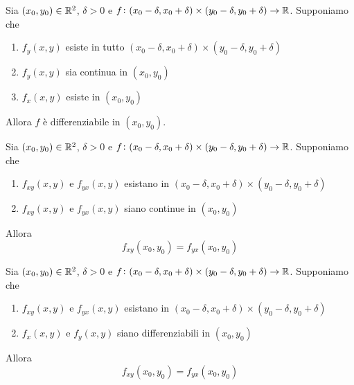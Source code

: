 \begin{thm}
	Sia $ (x_0, y_0) \in \mathbb{R}^2 $, $ \delta > 0 $ e $ f \colon (x_0 - \delta, x_0 + \delta) \times (y_0 - \delta, y_0 + \delta) \to \mathbb{R} $. Supponiamo che 
	\begin{enumerate}[label = (\roman*)]
		\item $ f_y(x, y) $ esiste in tutto $ (x_0 - \delta, x_0 + \delta) \times (y_0 - \delta, y_0 + \delta) $
		\item $ f_y(x, y) $ sia continua in $ (x_0, y_0) $
		\item $ f_x(x, y) $ esiste in $ (x_0, y_0) $
	\end{enumerate}
	Allora $ f $ è differenziabile in $ (x_0, y_0) $. 
\end{thm}

\begin{thm}[Schwarz 1]
	Sia $ (x_0, y_0) \in \mathbb{R}^2 $, $ \delta > 0 $ e $ f \colon (x_0 - \delta, x_0 + \delta) \times (y_0 - \delta, y_0 + \delta) \to \mathbb{R} $. Supponiamo che 
	\begin{enumerate}[label = (\roman*)]
		\item $ f_{xy}(x, y) $ e $ f_{yx}(x, y) $ esistano in $ (x_0 - \delta, x_0 + \delta) \times (y_0 - \delta, y_0 + \delta) $
		\item $ f_{xy}(x, y) $ e $ f_{yx}(x, y) $ siano continue in $ (x_0, y_0) $
	\end{enumerate}
	Allora 
	\begin{equation}
		f_{xy}(x_0, y_0) = f_{yx}(x_0, y_0)
	\end{equation}
\end{thm}

\begin{thm}[Schwarz 2]
	Sia $ (x_0, y_0) \in \mathbb{R}^2 $, $ \delta > 0 $ e $ f \colon (x_0 - \delta, x_0 + \delta) \times (y_0 - \delta, y_0 + \delta) \to \mathbb{R} $. Supponiamo che 
	\begin{enumerate}[label = (\roman*)]
		\item $ f_{xy}(x, y) $ e $ f_{yx}(x, y) $ esistano in $ (x_0 - \delta, x_0 + \delta) \times (y_0 - \delta, y_0 + \delta) $
		\item $ f_{x}(x, y) $ e $ f_{y}(x, y) $ siano differenziabili in $ (x_0, y_0) $
	\end{enumerate}
	Allora 
	\begin{equation*}
		f_{xy}(x_0, y_0) = f_{yx}(x_0, y_0)
	\end{equation*}
\end{thm}


